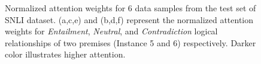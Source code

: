 \documentclass[11pt,a4paper]{article}
\begin{document}
\begin{figure}[ht]
\begin{center}
		\end{center}
		\caption{
			Normalized attention weights for 6 data samples from the test set of SNLI dataset. (a,c,e) and (b,d,f) represent the normalized attention weights for \emph{Entailment}, \emph{Neutral}, and \emph{Contradiction} logical relationships of two premises (Instance 5 and 6) respectively. Darker color illustrates higher attention. 
		}
		\label{fig:att:sample:3}
	\end{figure}
	
		
\end{document}

